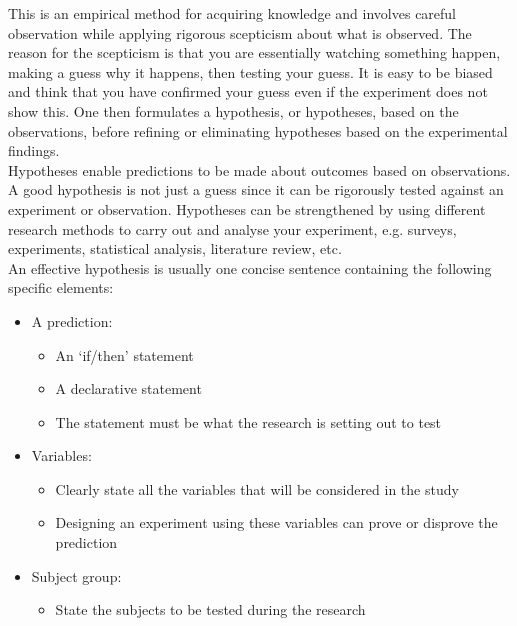 \documentclass[a4paper,12pt]{book}
\begin{document}
This is an empirical method for acquiring knowledge and involves careful observation while applying rigorous scepticism about what is observed. The reason for the scepticism is that you are essentially watching something happen, making a guess why it happens, then testing your guess. It is easy to be biased and think that you have confirmed your guess even if the experiment does not show this. One then formulates a hypothesis, or hypotheses, based on the observations, before refining or eliminating hypotheses based on the experimental findings.\\

Hypotheses enable predictions to be made about outcomes based on observations. A good hypothesis is not just a guess since it can be rigorously tested against an experiment or observation. Hypotheses can be strengthened by using different research methods to carry out and analyse your experiment, e.g. surveys, experiments, statistical analysis, literature review, etc.\\

An effective hypothesis is usually one concise sentence containing the following specific elements:

\begin{itemize}
\setlength{\itemsep}{-5pt}
    \item A prediction:
    \begin{itemize}
\setlength{\itemsep}{-5pt}
    \item An `if/then' statement
    \item A declarative statement
    \item The statement must be what the research is setting out to test
\end{itemize}
    \item Variables:
    \begin{itemize}
\setlength{\itemsep}{-5pt}
    \item Clearly state all the variables that will be considered in the study
    \item Designing an experiment using these variables can prove or disprove the prediction
\end{itemize}
    \item Subject group: 
    \begin{itemize}
\setlength{\itemsep}{-5pt}
    \item State the subjects to be tested during the research
\end{itemize}
\end{itemize}
\end{document}
